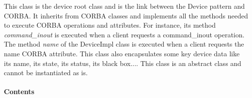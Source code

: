 This class is the device root class and is the link between the Device
pattern and CORBA. It inherits from
CORBA classes and implements all the methods needed to execute CORBA
operations and attributes. For instance, its method \emph{command\_inout}
is executed when a client requests a command\_inout operation. The
method \emph{name} of the DeviceImpl class is executed
when a client requests the name CORBA attribute. This class also encapsulates
some key device data like its name, its state,
its status, its black box.... This
class is an abstract class and cannot be instantiated as is. 

\paragraph{Contents}

